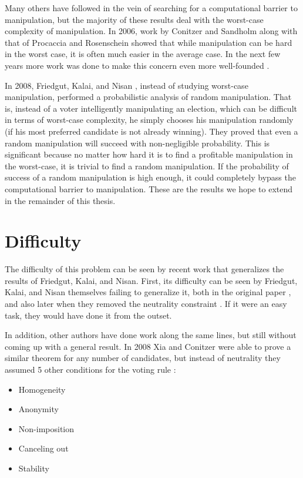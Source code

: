 	Many others have followed in the vein of searching for a computational barrier to manipulation, but the majority of these results deal with the worst-case complexity of manipulation. In 2006, work by Conitzer and Sandholm \cite{conitzer2006nonexistence} along with that of Procaccia and Rosenschein \cite{procaccia2006junta} showed that while manipulation can be hard in the worst case, it is often much easier in the average case. In the next few years more work was done to make this concern even more well-founded \cite{procaccia2007average, erdelyi2007approximating}.

	In 2008, Friedgut, Kalai, and Nisan \cite{friedgut2008elections}, instead of studying worst-case manipulation, performed a probabilistic analysis of random manipulation. That is, instead of a voter intelligently manipulating an election, which can be difficult in terms of worst-case complexity, he simply chooses his manipulation randomly (if his most preferred candidate is not already winning). They proved that even a random manipulation will succeed with non-negligible probability. This is significant because no matter how hard it is to find a profitable manipulation in the worst-case, it is trivial to find a random manipulation. If the probability of success of a random manipulation is high enough, it could completely bypass the computational barrier to manipulation. These are the results we hope to extend in the remainder of this thesis.


\section{Difficulty}

	The difficulty of this problem can be seen by recent work that generalizes the results of Friedgut, Kalai, and Nisan. First, its difficulty can be seen by Friedgut, Kalai, and Nisan themselves failing to generalize it, both in the original paper \cite{friedgut2008elections}, and also later when they removed the neutrality constraint \cite{friedgut2011quantitative}. If it were an easy task, they would have done it from the outset.

	In addition, other authors have done work along the same lines, but still without coming up with a general result. In 2008 Xia and Conitzer were able to prove a similar theorem for any number of candidates, but instead of neutrality they assumed 5 other conditions for the voting rule \cite{xia2008sufficient}:

	\begin{itemize}
		\item Homogeneity
		\item Anonymity
		\item Non-imposition
		\item Canceling out
		\item Stability
	\end{itemize}

